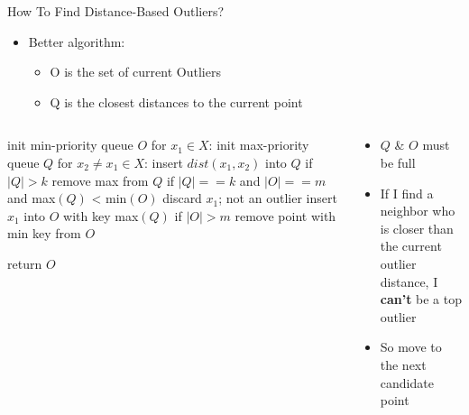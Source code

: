 \documentclass[aspectratio=169]{beamer}
\begin{document}
\begin{frame}[fragile]{How To Find Distance-Based Outliers?}

\begin{itemize}
\item Better algorithm: 
       \begin{itemize}
	\item O is the set of current Outliers
	\item Q is the closest distances to the current point
        \end{itemize}
\end{itemize}
\begin{columns}
\begin{column}{0.5\textwidth}
\begin{SQL}
init min-priority queue $O$
for $x_1 \in X$:
  init max-priority queue $Q$
  for $x_2 \neq x_1 \in X$:
    insert $dist(x_1, x_2)$ into $Q$
    if $|Q| > k$
      remove max from $Q$
    if $|Q| == k$ and $|O| == m$ and max$(Q)$ < min$(O)$ 
      discard $x_1$; not an outlier
  insert $x_1$ into $O$ with key max$(Q)$
  if $|O| > m$
    remove point with min key from $O$

return $O$ 
\end{SQL}
\end{column}
\begin{column}{0.4\textwidth}
\begin{itemize}
\item $Q$ \& $O$ must be full
\item If I find a neighbor who is closer than the current outlier distance, I \textbf{can't} be a top outlier
\item So move to the next candidate point
\end{itemize}
\end{column}
\end{columns}


\end{frame}
\end{document}
